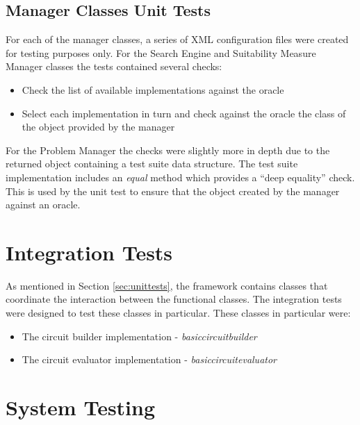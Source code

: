 \subsection{Manager Classes Unit Tests}
For each of the manager classes, a series of XML configuration files were created for testing purposes only.
For the Search Engine and Suitability Measure Manager classes the tests contained several checks:
\begin{itemize}
 \item Check the list of available implementations against the oracle
 \item Select each implementation in turn and check against the oracle the class of the object provided by the manager
\end{itemize}

For the Problem Manager the checks were slightly more in depth due to the returned object containing a test suite data structure.
The test suite implementation includes an \emph{equal} method which provides a ``deep equality'' check.
This is used by the unit test to ensure that the object created by the manager against an oracle.

\section{Integration Tests}
As mentioned in Section \ref{sec:unittests}, the framework contains classes that coordinate the interaction between the functional classes.
The integration tests were designed to test these classes in particular.
These classes in particular were:
\begin{itemize}
 \item The circuit builder implementation - \emph{basiccircuitbuilder}
 \item The circuit evaluator implementation - \emph{basiccircuitevaluator}
\end{itemize}



\section{System Testing}

